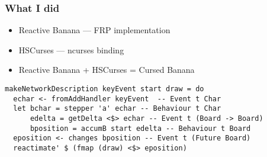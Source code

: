 \documentclass{beamer}
\begin{document}
\begin{frame}[fragile]
  \frametitle{What I did}

  \begin{itemize}
    \item Reactive Banana --- FRP implementation
    \item HSCurses --- ncurses binding
    \item Reactive Banana + HSCurses = Cursed Banana
  \end{itemize}

  \small
  \begin{Verbatim}
makeNetworkDescription keyEvent start draw = do
  echar <- fromAddHandler keyEvent  -- Event t Char
  let bchar = stepper 'a' echar -- Behaviour t Char
      edelta = getDelta <$> echar -- Event t (Board -> Board)
      bposition = accumB start edelta -- Behaviour t Board
  eposition <- changes bposition -- Event t (Future Board)
  reactimate' $ (fmap (draw) <$> eposition)

  \end{Verbatim}
\end{frame}
\end{document}
